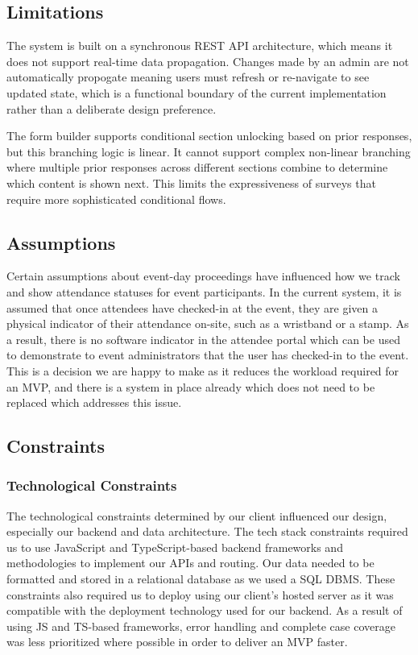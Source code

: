 \documentclass{article}
\begin{document}
 \subsection{Limitations}
The system is built on a synchronous REST API architecture, which means it does not support real-time data propagation. Changes made by an admin are not automatically propogate meaning users must refresh or re-navigate to see updated state, which is a functional boundary of the current implementation rather than a deliberate design preference.

The form builder supports conditional section unlocking based on prior responses, but this branching logic is linear. It cannot support complex non-linear branching where multiple prior responses across different sections combine to determine which content is shown next. This limits the expressiveness of surveys that require more sophisticated conditional flows.

 \subsection{Assumptions}
Certain assumptions about event-day proceedings have influenced how we track and
show attendance statuses for event participants. In the current system, it is
assumed that once attendees have checked-in at the event, they are given a
physical indicator of their attendance on-site, such as a wristband or a stamp.
As a result, there is no software indicator in the attendee portal which can be
used to demonstrate to event administrators that the user has checked-in to the
event. This is a decision we are happy to make as it reduces the workload
required for an MVP, and there is a system in place already which does not need
to be replaced which addresses this issue.

\subsection{Constraints}
\subsubsection{Technological Constraints}
The technological constraints determined by our client influenced our design,
especially our backend and data architecture. The tech stack constraints
required us to use JavaScript and TypeScript-based backend frameworks and
methodologies to implement our APIs and routing. Our data needed to be formatted
and stored in a relational database as we used a SQL DBMS. These constraints
also required us to deploy using our client's hosted server as it was compatible
with the deployment technology used for our backend. As a result of using JS and
TS-based frameworks, error handling and complete case coverage was less prioritized
where possible in order to deliver an MVP faster.
\end{document}
